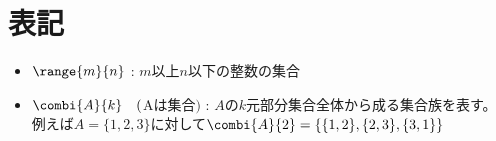 \chapter{表記}
    \begin{itemize}
        \item $\range{m}{n}$ : $m$以上$n$以下の整数の集合
        \item $\combi{A}{k}\quad($A$は集合)$ : $A$の$k$元部分集合全体から成る集合族を表す。\\
        例えば$A=\{1,2,3\}$に対して$\combi{A}{2}=\{\{1,2\},\{2,3\},\{3,1\}\}$
    \end{itemize}